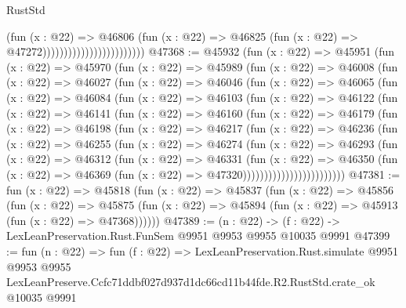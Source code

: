 \begin{lexlean}{RustStd}
\begin{coremodule}
                                              (fun (x : @22) =>
                                              @46806
                                                (fun (x : @22) =>
                                                @46825
                                                  (fun (x : @22) => @47272))))))))))))))))))))))))
@47368 := @45932
    (fun (x : @22) =>
    @45951
      (fun (x : @22) =>
      @45970
        (fun (x : @22) =>
        @45989
          (fun (x : @22) =>
          @46008
            (fun (x : @22) =>
            @46027
              (fun (x : @22) =>
              @46046
                (fun (x : @22) =>
                @46065
                  (fun (x : @22) =>
                  @46084
                    (fun (x : @22) =>
                    @46103
                      (fun (x : @22) =>
                      @46122
                        (fun (x : @22) =>
                        @46141
                          (fun (x : @22) =>
                          @46160
                            (fun (x : @22) =>
                            @46179
                              (fun (x : @22) =>
                              @46198
                                (fun (x : @22) =>
                                @46217
                                  (fun (x : @22) =>
                                  @46236
                                    (fun (x : @22) =>
                                    @46255
                                      (fun (x : @22) =>
                                      @46274
                                        (fun (x : @22) =>
                                        @46293
                                          (fun (x : @22) =>
                                          @46312
                                            (fun (x : @22) =>
                                            @46331
                                              (fun (x : @22) =>
                                              @46350
                                                (fun (x : @22) =>
                                                @46369
                                                  (fun (x : @22) => @47320))))))))))))))))))))))))
@47381 := fun (x : @22) =>
  @45818
    (fun (x : @22) =>
    @45837
      (fun (x : @22) =>
      @45856
        (fun (x : @22) =>
        @45875 (fun (x : @22) => @45894 (fun (x : @22) => @45913 (fun (x : @22) => @47368))))))
@47389 := (n : @22) -> (f : @22) -> LexLeanPreservation.Rust.FunSem @9951 @9953 @9955 @10035 @9991
@47399 := fun (n : @22) =>
  fun (f : @22) =>
  LexLeanPreservation.Rust.simulate
    @9951
    @9953
    @9955
    LexLeanPreserve.Ccfc71ddbf027d937d1dc66cd11b44fde.R2.RustStd.crate_ok
    @10035
    @9991
\end{coremodule}
\end{lexlean}
